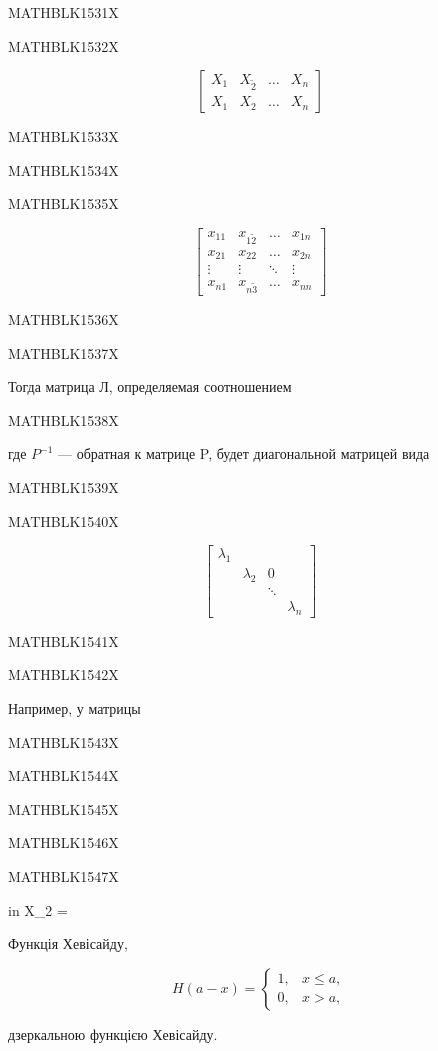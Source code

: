 \documentclass[
  ukrainian,
]{article}
\begin{document}
MATHBLK1531X

MATHBLK1532X

\[
\begin{bmatrix} X_1 & X_{\tilde{2}} & \dots & X_n \\ X_{1} & X_{2} & \dots & X_n \end{bmatrix}
\]

MATHBLK1533X

MATHBLK1534X

MATHBLK1535X

\[
\begin{bmatrix} x_{11} & x_{1\tilde{2}} & \dots & x_{1n} \\ x_{21} & x_{22} & \dots & x_{2n} \\ \vdots & \vdots & \ddots & \vdots \\ x_{n1} & x_{n\tilde{3}} & \dots & x_{nn} \end{bmatrix}
\]

MATHBLK1536X

MATHBLK1537X

Тогда матрица Л, определяемая соотношением

MATHBLK1538X

где \(P^{-1}\) --- обратная к матрице P, будет диагональной матрицей
вида

MATHBLK1539X

MATHBLK1540X

\[
\begin{bmatrix} \lambda_1 & & & \\ & \lambda_2 & 0 & \\ & & \ddots & \\ & & & \lambda_n \end{bmatrix}
\]

MATHBLK1541X

MATHBLK1542X

Например, у матрицы

MATHBLK1543X

MATHBLK1544X

MATHBLK1545X

MATHBLK1546X

MATHBLK1547X

in X\_2 =

Функція Хевісайду,

\[
H(a-x) = \begin{cases} 1, & x \leqslant a, \\ 0, & x > a, \end{cases}
\]

дзеркальною функцією Хевісайду.
\end{document}
